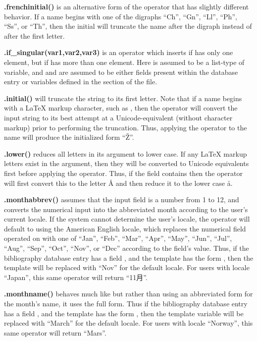 \documentclass[letterpaper,10pt,english]{sphinxmanual}
\begin{document}
\textbf{.frenchinitial()} is an alternative form of the  operator that has slightly different behavior. If a name begins with one of the digraphs
``Ch'', ``Gn'', ``Ll'', ``Ph'', ``Ss'', or ``Th'', then the initial will truncate the name after the digraph instead of after the first letter.

\textbf{.if\_singular(var1,var2,var3)} is an operator which inserts  if  has only one element, but  if  has more than one element. Here  is assumed to be a list-type of variable, and  and  are assumed to be either fields present within the database entry or variables defined in the  section of the file.

\textbf{.initial()} will truncate the string to its first letter. Note that if a name begins with a LaTeX markup character, such as , then the operator will convert the input string to its best attempt at a Unicode-equivalent (without character markup) prior to performing the truncation. Thus, applying the  operator to the name  will produce the initialized form ``Ž''.

\textbf{.lower()} reduces all letters in its argument to lower case. If any LaTeX markup letters exist in the argument, then they will be converted to Unicode equivalents first before applying the operator. Thus, if the field  contains  then the operator will first convert this to the letter Å and then reduce it to the lower case å.

\textbf{.monthabbrev()} assumes that the input field is a number from 1 to 12, and converts the numerical input into the abbreviated month according to the user's current locale. If the system cannot determine the user's locale, the operator will default to using the American English locale, which replaces the numerical field operated on with one of ``Jan'', ``Feb'', ``Mar'', ``Apr'', ``May'', ``Jun'', ``Jul'', ``Aug'', ``Sep'', ``Oct'', ``Nov'', or ``Dec'' according to the field's value. Thus, if the bibliography database entry has a field , and the template has the form , then the template will be replaced with ``Nov'' for the default locale. For users with locale ``Japan'', this same operator will return ``11月''.

\textbf{.monthname()} behaves much like  but rather than using an abbreviated form for the month's name, it uses the full form. Thus if the bibliography database entry has a field , and the template has the form , then the template variable will be replaced with ``March'' for the default locale. For users with locale ``Norway'', this same operator will return ``Mars''.
\end{document}
